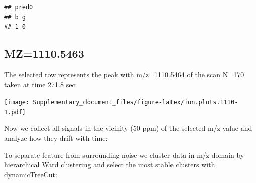 \documentclass[]{article}
\newenvironment{Shaded}{\begin{snugshade}}{\end{snugshade}}
\newcommand{\KeywordTok}[1]{\textcolor[rgb]{0.13,0.29,0.53}{\textbf{#1}}}
\newcommand{\FloatTok}[1]{\textcolor[rgb]{0.00,0.00,0.81}{#1}}
\newcommand{\StringTok}[1]{\textcolor[rgb]{0.31,0.60,0.02}{#1}}
\newcommand{\OperatorTok}[1]{\textcolor[rgb]{0.81,0.36,0.00}{\textbf{#1}}}
\newcommand{\NormalTok}[1]{#1}
\begin{document}
\begin{verbatim}
## pred0
## b g 
## 1 0
\end{verbatim}

\subsection{MZ=1110.5463}\label{mz1110.5463}

\begin{Shaded}
\end{Shaded}

The selected row represents the peak with m/z=1110.5464 of the scan
N=170 taken at time 271.8 sec:

\begin{Shaded}
\end{Shaded}

\texttt{[image: Supplementary\_document\_files/figure-latex/ion.plots.1110-1.pdf]}

Now we collect all signals in the vicinity (50 ppm) of the selected m/z
value and analyze how they drift with time:

\begin{Shaded}
\end{Shaded}

To separate feature from surrounding noise we cluster data in m/z domain
by hierarchical Ward clustering and select the most stable clusters with
dynamicTreeCut:
\end{document}
